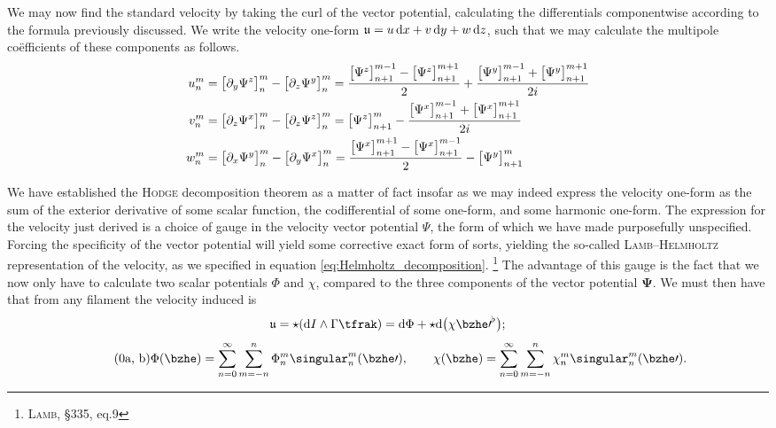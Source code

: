 \noindent
We may now find the standard velocity by taking the curl of the vector potential, calculating the differentials componentwise according to the formula previously discussed.
We write the velocity one-form $\mathfrak{u} = u\,\mathrm{d} x + v\,\mathrm{d} y + w\,\mathrm{d} z$, such that we may calculate the multipole coëfficients of these components as follows.
%
\begin{subequations}
  \begin{align}
    {u}_n^m &
    = {\big[ \partial_y\Psi^z \big]}_n^m - {\big[ \partial_z\Psi^y \big]}_n^m
    = \frac{{\big[ \Psi^z \big]}_{n+1}^{m-1} - {\big[ \Psi^z \big]}_{n+1}^{m+1}}{2}
    + \frac{{\big[ \Psi^y \big]}_{n+1}^{m-1} + {\big[ \Psi^y \big]}_{n+1}^{m+1}}{2i}\\
    {v}_n^m &
    = {\big[ \partial_z\Psi^x \big]}_n^m - {\big[ \partial_z\Psi^z \big]}_n^m
    = {\big[ \Psi^z \big]}_{n+1}^{m} - \frac{{\big[ \Psi^x \big]}_{n+1}^{m-1} + {\big[ \Psi^x \big]}_{n+1}^{m+1}}{2i}\\
    {w}_n^m &
    = {\big[ \partial_x\Psi^y \big]}_n^m - {\big[ \partial_y\Psi^x \big]}_n^m
    = \frac{{\big[ \Psi^x \big]}_{n+1}^{m+1} - {\big[ \Psi^x \big]}_{n+1}^{m-1}}{2} - {\big[ \Psi^y \big]}_{n+1}^{m}
  \end{align}
\end{subequations}

\noindent
We have established the \textsc{Hodge} decomposition theorem as a matter of fact insofar as we may indeed express the velocity one-form as the sum of the exterior derivative of some scalar function, the codifferential of some one-form, and some harmonic one-form.
The expression for the velocity just derived is a choice of gauge in the velocity vector potential $\Psi$, the form of which we have made purposefully unspecified.
Forcing the specificity of the vector potential will yield some corrective exact form of sorts, yielding the so-called \textsc{Lamb}--\textsc{Helmholtz} representation of the velocity, as we specified in equation \eqref{eq:Helmholtz_decomposition}.%
\footnote{%
  \cite{lamb1945hydrodynamics} \textsc{Lamb}, \S{335}, eq.9
}
The advantage of this gauge is the fact that we now only have to calculate two scalar potentials $\Phi$ and $\chi$, compared to the three components of the vector potential $\mathbf{\Psi}$.
We must then have that from any filament the velocity induced is
%
\begin{equation}
  \ufrak = \star(\dee I \wedge \Gamma \tfrak) = \dee\Phi + \star\dee \big( \chi {\bzhe\prime}^{\flat} \big);
\end{equation}
%
\begin{subequations}
  \begin{equation}\tag{\theequation{a, b}}
    \Phi(\bzhe) = \sum_{n = 0}^{\infty} \sum_{m = -n}^{n} \Phi_n^m \singular_n^m(\bzhe\prime), \qquad
    \chi(\bzhe) = \sum_{n = 0}^{\infty} \sum_{m = -n}^{n} \chi_n^m \singular_n^m(\bzhe\prime).
  \end{equation}
\end{subequations}

